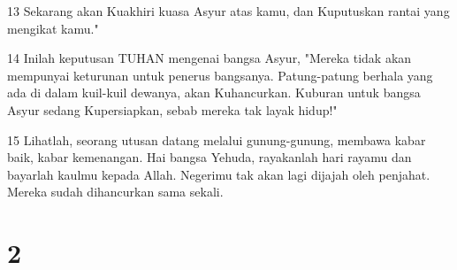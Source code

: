 \par 13 Sekarang akan Kuakhiri kuasa Asyur atas kamu, dan Kuputuskan rantai yang mengikat kamu."
\par 14 Inilah keputusan TUHAN mengenai bangsa Asyur, "Mereka tidak akan mempunyai keturunan untuk penerus bangsanya. Patung-patung berhala yang ada di dalam kuil-kuil dewanya, akan Kuhancurkan. Kuburan untuk bangsa Asyur sedang Kupersiapkan, sebab mereka tak layak hidup!"
\par 15 Lihatlah, seorang utusan datang melalui gunung-gunung, membawa kabar baik, kabar kemenangan. Hai bangsa Yehuda, rayakanlah hari rayamu dan bayarlah kaulmu kepada Allah. Negerimu tak akan lagi dijajah oleh penjahat. Mereka sudah dihancurkan sama sekali.

\chapter{2}


